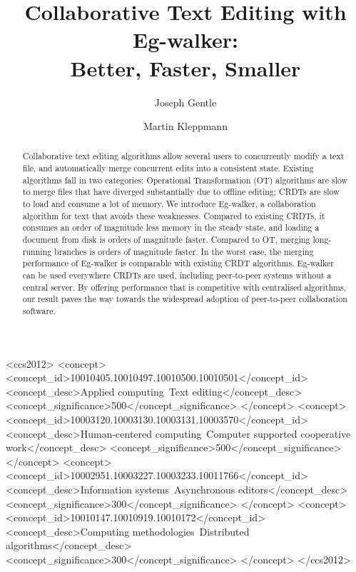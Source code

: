 \documentclass[sigplan,10pt]{acmart}
\newcommand{\algname}{Eg-walker\xspace}
\begin{document}
\def\sectionautorefname{Section}%
\def\subsectionautorefname{Section}%
\def\subsubsectionautorefname{Section}%
\def\listingautorefname{Listing}%

\title[Collaborative Text Editing with Eg-walker: Better, Faster, Smaller]{Collaborative Text Editing with Eg-walker:\\ Better, Faster, Smaller}
\author{Joseph Gentle}

\author{Martin Kleppmann}

\begin{abstract}
  Collaborative text editing algorithms allow several users to concurrently modify a text file, and automatically merge concurrent edits into a consistent state.
  Existing algorithms fall in two categories: Operational Transformation (OT) algorithms are slow to merge files that have diverged substantially due to offline editing; CRDTs are slow to load and consume a lot of memory.
  We introduce \algname, a collaboration algorithm for text that avoids these weaknesses.
  Compared to existing CRDTs, it consumes an order of magnitude less memory in the steady state, and loading a document from disk is orders of magnitude faster.
  Compared to OT, merging long-running branches is orders of magnitude faster.
  In the worst case, the merging performance of \algname is comparable with existing CRDT algorithms.
  \algname can be used everywhere CRDTs are used, including peer-to-peer systems without a central server.
  By offering performance that is competitive with centralised algorithms, our result paves the way towards the widespread adoption of peer-to-peer collaboration software.
\end{abstract}

\begin{CCSXML}
  <ccs2012>
    <concept>
      <concept_id>10010405.10010497.10010500.10010501</concept_id>
      <concept_desc>Applied computing~Text editing</concept_desc>
      <concept_significance>500</concept_significance>
    </concept>
    <concept>
      <concept_id>10003120.10003130.10003131.10003570</concept_id>
      <concept_desc>Human-centered computing~Computer supported cooperative work</concept_desc>
      <concept_significance>500</concept_significance>
    </concept>
    <concept>
      <concept_id>10002951.10003227.10003233.10011766</concept_id>
      <concept_desc>Information systems~Asynchronous editors</concept_desc>
      <concept_significance>300</concept_significance>
    </concept>
    <concept>
      <concept_id>10010147.10010919.10010172</concept_id>
      <concept_desc>Computing methodologies~Distributed algorithms</concept_desc>
      <concept_significance>300</concept_significance>
    </concept>
  </ccs2012>
\end{CCSXML}
\end{document}
